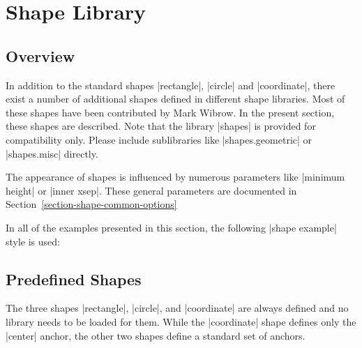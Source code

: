 %
%
%


\section{Shape Library}
\label{section-libs-shapes}

\subsection{Overview}

In addition to the standard shapes |rectangle|, |circle| and |coordinate|,
there exist a number of additional shapes defined in different shape libraries.
Most of these shapes have been contributed by Mark Wibrow. In the present
section, these shapes are described. Note that the library |shapes| is provided
for compatibility only. Please include sublibraries like |shapes.geometric| or
|shapes.misc| directly.

The appearance of shapes is influenced by numerous parameters like
|minimum height| or |inner xsep|. These general parameters are documented in
Section~\ref{section-shape-common-options}

In all of the examples presented in this section, the following |shape example|
style is used:
%
\begin{codeexample}
\end{codeexample}


\subsection{Predefined Shapes}
\label{section-predefined-shapes}

The three shapes |rectangle|, |circle|, and |coordinate| are always defined and
no library needs to be loaded for them. While the |coordinate| shape defines
only the |center| anchor, the other two shapes define a standard set of
anchors.

